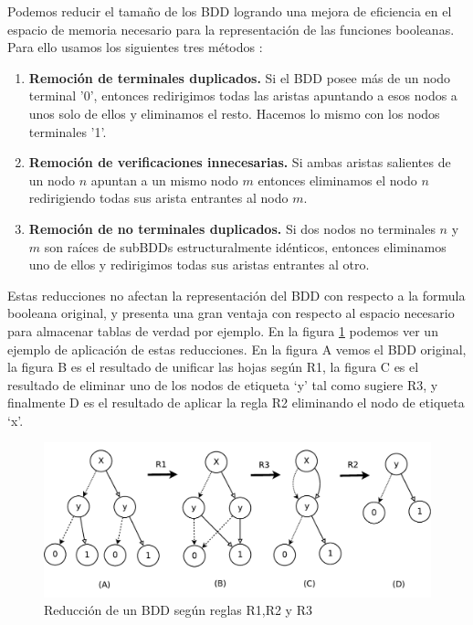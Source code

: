 \documentclass[titlepage, 12pt]{book}
\begin{document}
Podemos reducir el tama\~no de los BDD logrando una mejora de eficiencia en el espacio de memoria necesario para la representaci\'on de las funciones booleanas. Para ello usamos los siguientes tres m\'etodos \cite{Huth}:
\begin{enumerate}[R1--]
\item \textbf{Remoci\'on de terminales duplicados.} Si el BDD posee m\'as de un nodo terminal '0', entonces redirigimos todas las aristas apuntando a esos nodos a unos solo de ellos y eliminamos el resto. Hacemos lo mismo con los nodos terminales '1'.
\item \textbf{Remoci\'on de verificaciones innecesarias.} Si ambas aristas salientes de un nodo $n$ apuntan a un mismo nodo $m$ entonces eliminamos el nodo $n$ redirigiendo todas sus arista entrantes al nodo $m$.
\item \textbf{Remoci\'on de no terminales duplicados.} Si dos nodos no terminales $n$ y $m$ son ra\'ices de subBDDs estructuralmente id\'enticos, entonces eliminamos uno de ellos y redirigimos todas sus aristas entrantes al otro.
\end{enumerate}
Estas reducciones no afectan la representaci\'on del BDD con respecto a la formula booleana original, y presenta una gran ventaja con respecto al espacio necesario para almacenar tablas de verdad por ejemplo. En la figura \ref{reduccionBDD} podemos ver un ejemplo de aplicaci\'on de estas reducciones. En la figura A vemos el BDD original, la figura B es el resultado de unificar las hojas seg\'un R1, la figura C es el resultado de eliminar uno de los nodos de etiqueta `y' tal como sugiere R3, y finalmente D es el resultado de aplicar la regla R2 eliminando el nodo de etiqueta `x'.

\begin{figure}[H]
  \centering
    \includegraphics[scale=0.75]{Imagenes/reduccionBDD.pdf}
  \caption{Reducci\'on de un BDD seg\'un reglas R1,R2 y R3}
  \label{reduccionBDD}
\end{figure}
~\\
\end{document}
